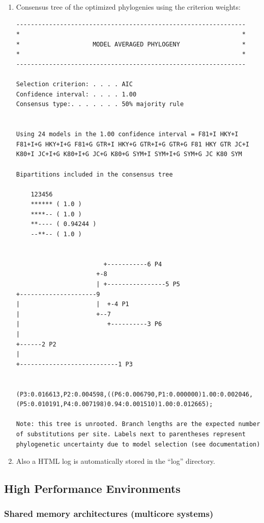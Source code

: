 \begin{enumerate}
\begin{enumerate}
\item Consensus tree of the optimized phylogenies using the criterion weights:

\begin{lstlisting}
---------------------------------------------------------------
*                                                             *
*                    MODEL AVERAGED PHYLOGENY                 *
*                                                             *
---------------------------------------------------------------

Selection criterion: . . . . AIC
Confidence interval: . . . . 1.00
Consensus type:. . . . . . . 50% majority rule


Using 24 models in the 1.00 confidence interval = F81+I HKY+I F81+I+G HKY+I+G F81+G GTR+I HKY+G GTR+I+G GTR+G F81 HKY GTR JC+I K80+I JC+I+G K80+I+G JC+G K80+G SYM+I SYM+I+G SYM+G JC K80 SYM

Bipartitions included in the consensus tree

    123456
    ****** ( 1.0 )
    ****-- ( 1.0 )
    **---- ( 0.94244 )
    --**-- ( 1.0 )


                        +-----------6 P4
                      +-8
                      | +----------------5 P5
+---------------------9
|                     |  +-4 P1
|                     +--7
|                        +----------3 P6
|
+------2 P2
|
+---------------------------1 P3


(P3:0.016613,P2:0.004598,((P6:0.006790,P1:0.000000)1.00:0.002046,(P5:0.010191,P4:0.007198)0.94:0.001510)1.00:0.012665);

Note: this tree is unrooted. Branch lengths are the expected number of substitutions per site. Labels next to parentheses represent phylogenetic uncertainty due to model selection (see documentation)
\end{lstlisting}

\item Also a HTML log is automatically stored in the ``log'' directory.

\end{enumerate}
\end{enumerate}

\subsection{High Performance Environments}

\subsubsection{Shared memory architectures (multicore systems)}

